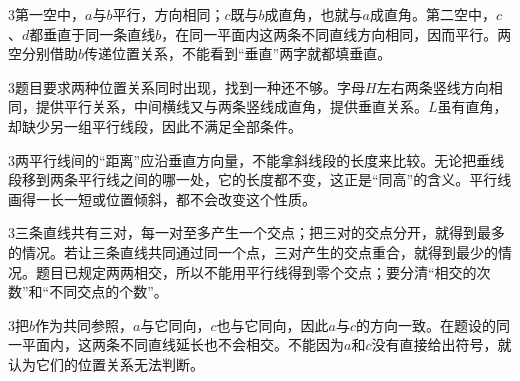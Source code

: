\documentclass[multi=snippet,border={5bp 20bp 5bp 5bp}]{standalone}
\newenvironment{snippet}[3]{\begin{minipage}{#1bp}\color{answerred}\fontsize{#2}{#3}\selectfont\raggedright}{\end{minipage}}
\begin{document}
\begin{snippet}{505}{11.5}{14}\begin{multicols}{3}\raggedcolumns 第一空中，\(a\)\allowbreak 与\(b\)\allowbreak 平行，方向相同；\(c\)\allowbreak 既与\(b\)\allowbreak 成直角，也就与\(a\)\allowbreak 成直角。第二空中，\(c\)\allowbreak 、\(d\)\allowbreak 都垂直于同一条直线\(b\)\allowbreak ，在同一平面内这两条不同直线方向相同，因而平行。两空分别借助\(b\)\allowbreak 传递位置关系，不能看到“垂直”两字就都填垂直。\end{multicols}\end{snippet}
\begin{snippet}{505}{11.5}{14}\begin{multicols}{3}\raggedcolumns 题目要求两种位置关系同时出现，找到一种还不够。字母\(H\)\allowbreak 左右两条竖线方向相同，提供平行关系，中间横线又与两条竖线成直角，提供垂直关系。\(L\)\allowbreak 虽有直角，却缺少另一组平行线段，因此不满足全部条件。\end{multicols}\end{snippet}
\begin{snippet}{505}{11.5}{14}\begin{multicols}{3}\raggedcolumns 两平行线间的“距离”应沿垂直方向量，不能拿斜线段的长度来比较。无论把垂线段移到两条平行线之间的哪一处，它的长度都不变，这正是“同高”的含义。平行线画得一长一短或位置倾斜，都不会改变这个性质。\end{multicols}\end{snippet}
\begin{snippet}{505}{11.5}{14}\begin{multicols}{3}\raggedcolumns 三条直线共有三对，每一对至多产生一个交点；把三对的交点分开，就得到最多的情况。若让三条直线共同通过同一个点，三对产生的交点重合，就得到最少的情况。题目已规定两两相交，所以不能用平行线得到零个交点；要分清“相交的次数”和“不同交点的个数”。\end{multicols}\end{snippet}
\begin{snippet}{505}{11.5}{14}\begin{multicols}{3}\raggedcolumns 把\(b\)\allowbreak 作为共同参照，\(a\)\allowbreak 与它同向，\(c\)\allowbreak 也与它同向，因此\(a\)\allowbreak 与\(c\)\allowbreak 的方向一致。在题设的同一平面内，这两条不同直线延长也不会相交。不能因为\(a\)\allowbreak 和\(c\)\allowbreak 没有直接给出符号，就认为它们的位置关系无法判断。\end{multicols}\end{snippet}
\end{document}

